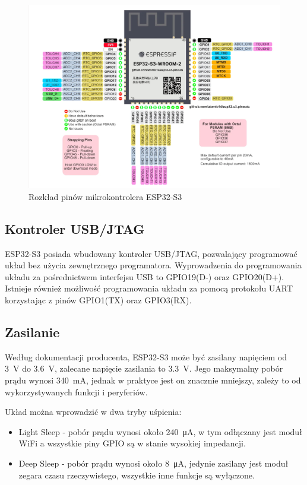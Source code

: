 \documentclass[../main.tex]{subfiles}
\begin{document}
\begin{figure}[H]
  \centering
  \includegraphics[width=1\textwidth]{Esp32.png}
  \caption{Rozkład pinów mikrokontrolera ESP32-S3 \cite{st:esp32-pin}}
  \label{fig:esp32}
\end{figure}

\subsection{Kontroler USB/JTAG}
ESP32-S3 posiada wbudowany kontroler USB/JTAG, pozwalający programować układ bez użycia zewnętrznego programatora.
Wyprowadzenia do programowania układu za pośrednictwem interfejsu USB to GPIO19(D-) oraz GPIO20(D+).
Istnieje również możliwość programowania układu za pomocą protokołu UART korzystając z pinów GPIO1(TX) oraz GPIO3(RX).


\subsection{Zasilanie}
Według dokumentacji producenta, ESP32-S3 może być zasilany napięciem od \SI{3}{\volt} do \SI{3.6}{\volt}, zalecane napięcie zasilania to \SI{3.3}{\volt}.
Jego maksymalny pobór prądu wynosi \SI{340}{\milli\ampere}, jednak w praktyce jest on znacznie mniejszy, zależy to od wykorzystywanych funkcji i peryferiów.

Układ można wprowadzić w dwa tryby uśpienia:
\begin{itemize}
\item Light Sleep - pobór prądu wynosi około \SI{240}{\micro\ampere}, w tym odłączany jest moduł WiFi a wszystkie piny GPIO są w stanie wysokiej impedancji.
\item Deep Sleep - pobór prądu wynosi około \SI{8}{\micro\ampere}, jedynie zasilany jest moduł zegara czasu rzeczywistego, wszystkie inne funkcje są wyłączone.
\end{itemize}
\end{document}
